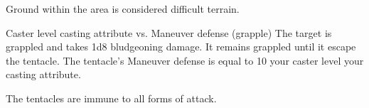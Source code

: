 \begin{spellheader}
\end{spellheader}
\begin{spellcontent}
    \begin{spelltargetinginfo}
    \end{spelltargetinginfo}
    \begin{spelleffects}
        \spelleffect Ground within the area is considered difficult terrain.
        \spelldur{\durshort \dismissable}
    \end{spelleffects}
\end{spellcontent}
\begin{spellsubcontent}
    \begin{spelltargetinginfo}
    \end{spelltargetinginfo}
    \begin{spelleffects}
        \begin{spellattack}{Caster level \add casting attribute vs. Maneuver defense (grapple)}
            \spellsuccess The target is grappled and takes 1d8 bludgeoning damage. It remains grappled until it escape the tentacle. The tentacle's Maneuver defense is equal to 10 \add your caster level \add your casting attribute.
        \end{spellattack}
    \end{spelleffects}
\end{spellsubcontent}
\begin{spellfooter}
    \spellnotes The tentacles are immune to all forms of attack.
\end{spellfooter}

